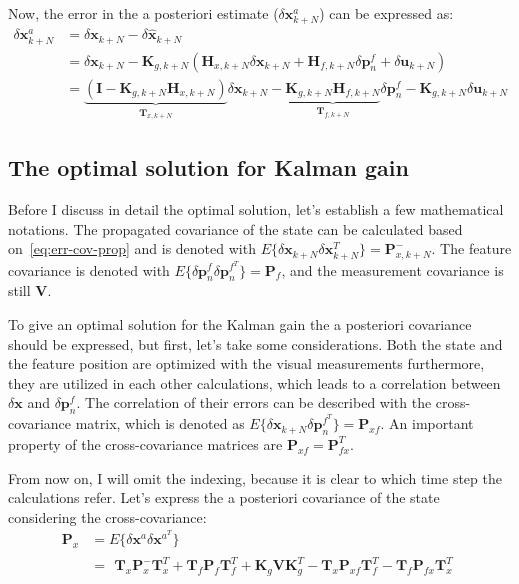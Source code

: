 Now, the error in the a posteriori estimate ($\delta\mathbf{x}_{k+N}^a$) can be expressed as:
\begin{equation}
\begin{aligned}
    \delta\mathbf{x}_{k+N}^a &= \delta\mathbf{x}_{k+N}-\delta\hat{\mathbf{x}}_{k+N} \\ &=
    \delta\mathbf{x}_{k+N} - \mathbf{K}_{g, k+N}(\mathbf{H}_{x,k+N}\delta\mathbf{x}_{k+N}+ \mathbf{H}_{f,k+N}\delta\mathbf{p}_{n}^f + \delta\mathbf{u}_{k+N}) \\ &=
    \underbrace{\left(\mathbf{I}-\mathbf{K}_{g, k+N}\mathbf{H}_{x,k+N}\right)}_{\mathbf{T}_{x, k+N}}\delta\mathbf{x}_{k+N} - \underbrace{\mathbf{K}_{g, k+N}\mathbf{H}_{f,k+N}}_{\mathbf{T}_{f, k+N}}\delta\mathbf{p}_{n}^f - \mathbf{K}_{g, k+N}\delta\mathbf{u}_{k+N}
\end{aligned}
\end{equation}

\subsection{The optimal solution for Kalman gain}

Before I discuss in detail the optimal solution, let's establish a few mathematical notations. The propagated covariance of the state can be calculated based on~\eqref{eq:err-cov-prop} and is denoted with $E\{\delta\mathbf{x}_{k+N}\delta\mathbf{x}_{k+N}^T\}=\mathbf{P}_{x,k+N}^-$. The feature covariance is denoted with $E\{\delta\mathbf{p}_n^f\delta\mathbf{p}_n^{f^T}\}=\mathbf{P}_f$, and the measurement covariance is still $\mathbf{V}$. 

To give an optimal solution for the Kalman gain the a posteriori covariance should be expressed, but first, let's take some considerations. Both the state and the feature position are optimized with the visual measurements furthermore, they are utilized in each other calculations, which leads to a correlation between $\delta\mathbf{x}$ and $\delta\mathbf{p}_{n}^f$. The correlation of their errors can be described with the cross-covariance matrix, which is denoted as $E\{\delta\mathbf{x}_{k+N}\delta\mathbf{p}_n^{f^T}\}=\mathbf{P}_{xf}$. An important property of the cross-covariance matrices are $\mathbf{P}_{xf}=\mathbf{P}_{fx}^T$. 

From now on, I will omit the indexing, because it is clear to which time step the calculations refer. Let's express the a posteriori covariance of the state considering the cross-covariance:
\begin{equation}
\begin{aligned}
    \mathbf{P}_x &=E\{\delta\mathbf{x}^a\delta\mathbf{x}^{a^T}\} \\ &=
    \begin{aligned}
    \mathbf{T}_x\mathbf{P}_x^-\mathbf{T}_x^T+\mathbf{T}_f\mathbf{P}_f\mathbf{T}_f^T +
    \mathbf{K}_g\mathbf{V}\mathbf{K}_g^T - \mathbf{T}_x\mathbf{P}_{xf}\mathbf{T}_f^T - \mathbf{T}_f\mathbf{P}_{fx}\mathbf{T}_x^T
    \end{aligned}
\end{aligned}
\end{equation}

